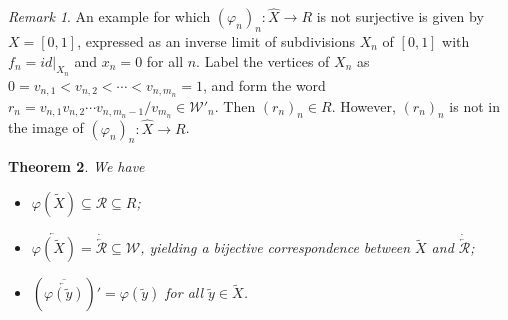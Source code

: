 \documentclass{amsart}
\newtheorem{theorem}{Theorem}[section]
\theoremstyle{definition}
\theoremstyle{remark}
\newtheorem{remark}[theorem]{Remark}
\numberwithin{equation}{section}
\begin{document}
\begin{remark}\label{nonsurj} An example for which $\displaystyle (\varphi_n)_n:\hat{X}\rightarrow  R$ is not surjective is given by $X=[0,1]$, expressed as an inverse limit of subdivisions $X_n$ of $[0,1]$ with $f_n=id|_{X_n}$ and $x_n=0$ for all $n$. Label the vertices  of $X_n$  as $0=v_{n,1}<v_{n,2}<\cdots< v_{n,m_n}=1$, and form the word $r_n=v_{n,1}v_{n,2}\cdots v_{n,{m_n-1}}/v_{m_n}\in {\mathcal W}'_n$. Then $(r_n)_n\in R$. However, $(r_n)_n$  is not in the image of $\displaystyle (\varphi_n)_n:\hat{X}\rightarrow  R$.
\end{remark}

\begin{theorem}\label{image}
We have\vspace{5pt}

 \begin{itemize}
\item[(a)] $\varphi(\tilde{X})\subseteq {\mathcal R}\subseteq R$;\vspace{10pt}

 \item[(b)] $\overleftarrow{\varphi(\tilde{X})}=\dot{\overleftarrow{\mathcal R}}\subseteq {\mathcal W}$, yielding a bijective correspondence between $\tilde{X}$ and  $\dot{\overleftarrow{\mathcal R}}$;

 \item[(c)] $\left(\overline{\overleftarrow{\varphi(\tilde{y})}}\right)'=\varphi(\tilde{y})$ for all $\tilde{y}\in \tilde{X}$.
 \end{itemize}
\end{theorem}
\end{document}
